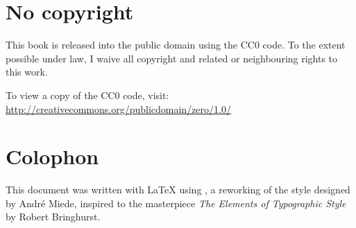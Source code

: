 \pagestyle{empty}

\hfill

\vfill


\section*{No copyright}
\ccLogo \ccZero This book is released into the public domain using the CC0 code. To the extent possible under law, I waive all copyright and related or neighbouring rights to this work.
	
To view a copy of the CC0 code, visit: \\\url{http://creativecommons.org/publicdomain/zero/1.0/}
\section*{Colophon}
This document was written with \LaTeX{} using \arsclassica, a reworking of the \classicthesis{} style designed by Andr\'e Miede, inspired to the masterpiece \emph{The Elements of Typographic Style} by Robert Bringhurst.